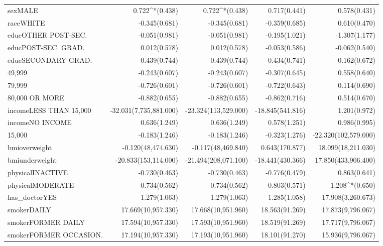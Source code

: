 \begin{longtable}{@{\extracolsep{5pt}}lD{.}{.}{-3} D{.}{.}{-3} D{.}{.}{-3} D{.}{.}{-3} }
  sexMALE & 0.722^{*}$ $(0.438) & 0.722^{*}$ $(0.438) & 0.717$ $(0.441) & 0.578$ $(0.431) \\ 
  raceWHITE & -0.345$ $(0.681) & -0.345$ $(0.681) & -0.359$ $(0.685) & 0.610$ $(0.470) \\ 
  educOTHER POST-SEC. & -0.051$ $(0.981) & -0.051$ $(0.981) & -0.195$ $(1.021) & -1.307$ $(1.177) \\ 
  educPOST-SEC. GRAD. & 0.012$ $(0.578) & 0.012$ $(0.578) & -0.053$ $(0.586) & -0.062$ $(0.540) \\ 
  educSECONDARY GRAD. & -0.439$ $(0.744) & -0.439$ $(0.744) & -0.434$ $(0.741) & -0.162$ $(0.672) \\ 
  49,999 & -0.243$ $(0.607) & -0.243$ $(0.607) & -0.307$ $(0.645) & 0.558$ $(0.640) \\ 
  79,999 & -0.726$ $(0.601) & -0.726$ $(0.601) & -0.722$ $(0.643) & 0.114$ $(0.690) \\ 
  80,000 OR MORE & -0.882$ $(0.655) & -0.882$ $(0.655) & -0.862$ $(0.716) & 0.514$ $(0.670) \\ 
  incomeLESS THAN 15,000 & -32.031$ $(7,735,881.000) & -23.324$ $(113,529.000) & -18.845$ $(541.816) & 1.201$ $(0.972) \\ 
  incomeNO INCOME & 0.636$ $(1.249) & 0.636$ $(1.249) & 0.578$ $(1.251) & 0.986$ $(0.995) \\ 
  15,000 & -0.183$ $(1.246) & -0.183$ $(1.246) & -0.323$ $(1.276) & -22.320$ $(102,579.000) \\ 
  bmioverweight & -0.120$ $(48,474.630) & -0.117$ $(48,469.840) & 0.643$ $(170.877) & 18.099$ $(18,211.030) \\ 
  bmiunderweight & -20.833$ $(153,114.000) & -21.494$ $(208,071.100) & -18.441$ $(430.366) & 17.850$ $(433,906.400) \\ 
  physicalINACTIVE & -0.730$ $(0.463) & -0.730$ $(0.463) & -0.776$ $(0.479) & 0.863$ $(0.641) \\ 
  physicalMODERATE & -0.734$ $(0.562) & -0.734$ $(0.562) & -0.803$ $(0.571) & 1.208^{*}$ $(0.650) \\ 
  has\_doctorYES & 1.279$ $(1.063) & 1.279$ $(1.063) & 1.285$ $(1.058) & 17.908$ $(3,260.673) \\ 
  smokerDAILY & 17.669$ $(10,957.330) & 17.668$ $(10,951.960) & 18.563$ $(91.269) & 17.873$ $(9,796.067) \\ 
  smokerFORMER DAILY & 17.594$ $(10,957.330) & 17.593$ $(10,951.960) & 18.519$ $(91.269) & 17.717$ $(9,796.067) \\ 
  smokerFORMER OCCASION. & 17.194$ $(10,957.330) & 17.193$ $(10,951.960) & 18.101$ $(91.270) & 15.936$ $(9,796.067) \\ 

\end{longtable}
